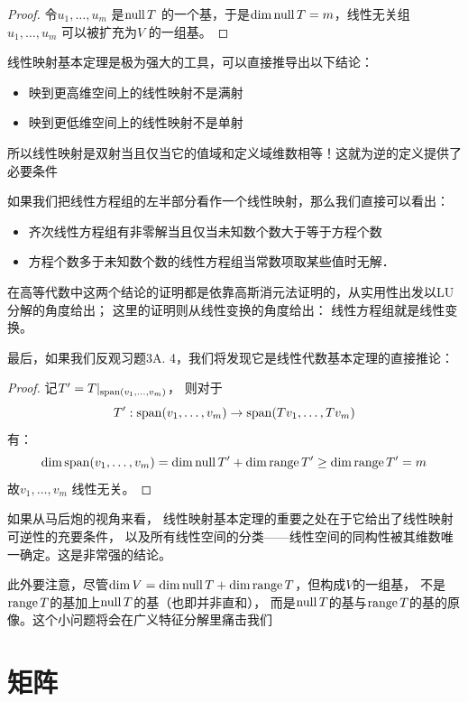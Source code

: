 \begin{proof}
    令\(u_1, \dots , u_{m}\) 是\(\operatorname{null} T\) 的一个基，于是\(\dim
    \operatorname{null} T = m\)，线性无关组 \(u_{1}, \dots ,u_{m}\) 可以被扩充为\(V\) 的一组基。
\end{proof}

线性映射基本定理是极为强大的工具，可以直接推导出以下结论：

\begin{itemize}
    \item 映到更高维空间上的线性映射不是满射
    \item 映到更低维空间上的线性映射不是单射
\end{itemize}
所以线性映射是双射当且仅当它的值域和定义域维数相等！这就为逆的定义提供了必要条件

如果我们把线性方程组的左半部分看作一个线性映射，那么我们直接可以看出：
\begin{itemize}
    \item 齐次线性方程组有非零解当且仅当未知数个数大于等于方程个数
    \item 方程个数多于未知数个数的线性方程组当常数项取某些值时无解．
\end{itemize}

在高等代数中这两个结论的证明都是依靠高斯消元法证明的，从实用性出发以LU分解的角度给出；
这里的证明则从线性变换的角度给出： 线性方程组就是线性变换。

最后，如果我们反观习题3A. 4，我们将发现它是线性代数基本定理的直接推论：
\begin{proof}
    记\(T'= T|_{\operatorname{span}(v_{1}, \dots, v_{m})}\)，
    则对于\[T': \operatorname{span}(v_{1}, \dots, v_{m}) \to
    \operatorname{span}(Tv_{1}, \dots, Tv_{m})\]
    有：
    \[
        \dim \operatorname{span}(v_{1}, \dots, v_{m}) = \dim
        \operatorname{null} T' +
        \dim \operatorname{range} T' \geq \dim \operatorname{range} T' = m
    \]
    故\(v_{1}, \dots, v_{m}\) 线性无关。
\end{proof}

如果从马后炮的视角来看，
线性映射基本定理的重要之处在于它给出了线性映射可逆性的充要条件，
以及所有线性空间的分类——线性空间的同构性被其维数唯一确定。这是非常强的结论。

此外要注意，尽管\(\dim V = \dim \operatorname{null} T + \dim \operatorname{range} T\)，但构成\(V\)的一组基，
不是\(\operatorname{range} T\)的基加上\(\operatorname{null} T\)的基（也即并非直和），
而是\(\operatorname{null} T\)的基与\(\operatorname{range} T\)的基的原像。这个小问题将会在广义特征分解里痛击我们

\section{矩阵}
